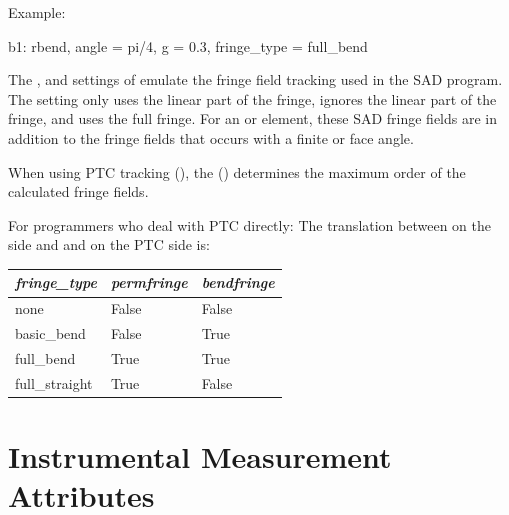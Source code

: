 Example:
\begin{example}
  b1: rbend, angle = pi/4, g = 0.3, fringe_type = full_bend
\end{example}

The ,  and  settings
of  emulate the fringe field tracking used in the SAD
program\cite{b:sad}.  The  setting only uses the linear
part of the fringe,  ignores the linear part of
the fringe, and  uses the full fringe.  For an 
or  element, these SAD fringe fields are in addition to the
fringe fields that occurs with a finite  or  face
angle. 

When using PTC tracking (), the
 () determines the maximum
order of the calculated fringe fields.

For programmers who deal with PTC directly: The translation between
 on the \bmad side and  and  
on the PTC side is:
\begin{center}
\begin{tabular}{lll} \hline 
{\em fringe_type} & {\em permfringe} & {\em bendfringe} \\ \hline
  none            & False            & False            \\    
  basic_bend      & False            & True             \\    
  full_bend       & True             & True             \\    
  full_straight   & True             & False            \\    
\end{tabular}
\end{center}

\section{Instrumental Measurement Attributes}
\label{s:meas.attrib}


